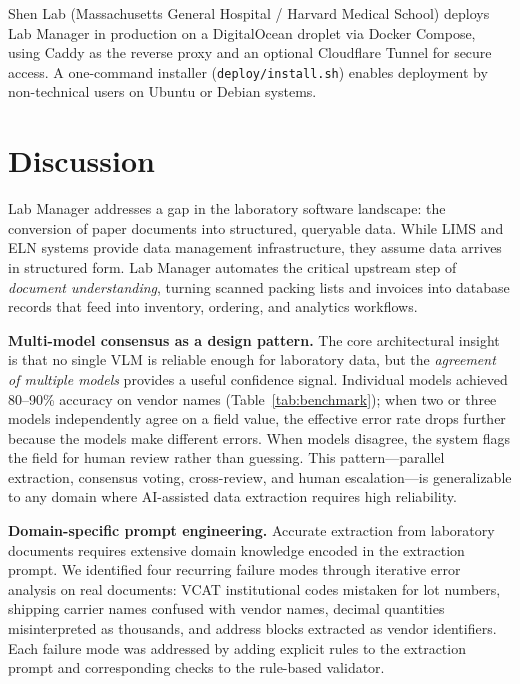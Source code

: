 \documentclass[11pt]{article}
\begin{document}
Shen Lab (Massachusetts General Hospital / Harvard Medical School)
deploys Lab Manager in production on a DigitalOcean droplet via Docker
Compose, using Caddy as the reverse proxy and an optional Cloudflare Tunnel
for secure access. A one-command installer (\texttt{deploy/install.sh})
enables deployment by non-technical users on Ubuntu or Debian systems.

\section{Discussion}
\label{sec:discussion}

Lab Manager addresses a gap in the laboratory software landscape: the
conversion of paper documents into structured, queryable data. While LIMS
and ELN systems provide data management infrastructure, they assume data
arrives in structured form. Lab Manager automates the critical upstream
step of \emph{document understanding}, turning scanned packing lists and
invoices into database records that feed into inventory, ordering, and
analytics workflows.

\textbf{Multi-model consensus as a design pattern.} The core architectural
insight is that no single VLM is reliable enough for laboratory data, but
the \emph{agreement of multiple models} provides a useful confidence
signal. Individual models achieved 80--90\% accuracy on vendor names
(Table~\ref{tab:benchmark}); when two or three models independently agree on
a field value, the effective error rate drops further because the models
make different errors. When models disagree, the system flags the field
for human review rather than guessing. This pattern---parallel extraction,
consensus voting, cross-review, and human escalation---is generalizable
to any domain where AI-assisted data extraction requires high reliability.

\textbf{Domain-specific prompt engineering.} Accurate extraction from
laboratory documents requires extensive domain knowledge encoded in the
extraction prompt. We identified four recurring failure modes through iterative
error analysis on real documents: VCAT institutional codes mistaken for
lot numbers, shipping carrier names confused with vendor names, decimal
quantities misinterpreted as thousands, and address blocks extracted as
vendor identifiers. Each failure mode was addressed by adding explicit
rules to the extraction prompt and corresponding checks to the rule-based
validator.
\end{document}
